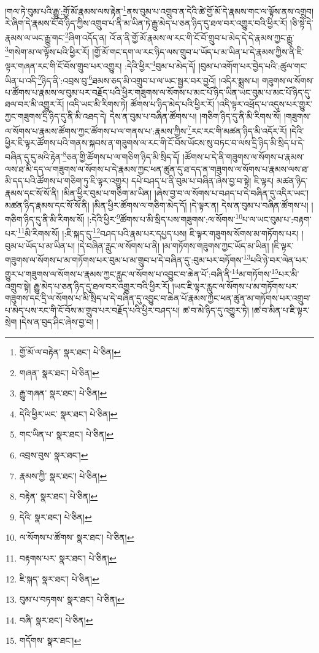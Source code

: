 །གལ་ཏེ་བུམ་པའི་རྒྱུ་:གྱོ་མོ་རྣམས་ལས་རྟེན་\footnote{གྱོ་མོ་ལ་བརྟེན་  སྣར་ཐང་།  པེ་ཅིན། }ནས་བུམ་པ་འགྲུབ་ན་དེའི་ཚེ་གྱོ་མོ་དེ་རྣམས་གང་ལ་ལྟོས་ནས་འགྲུབ། རེ་ཞིག་དེ་རྣམས་ངོ་བོ་ཉིད་ཀྱིས་འགྲུབ་པ་ནི་མ་ཡིན་ཏེ་རྒྱུ་མེད་པ་ཅན་ཉིད་དུ་ཐལ་བར་འགྱུར་བའི་ཕྱིར་རོ། །ཅི་སྟེ་དེ་རྣམས་ལ་ཡང་རྒྱུ་གང་\footnote{གཞན་  སྣར་ཐང་།  པེ་ཅིན། }ཞིག་འདོད་ན། འོ་ན་ནི་གྱོ་མོ་རྣམས་ལ་རང་གི་ངོ་བོ་གྲུབ་པ་མེད་དེ་དེ་རྣམས་ཀྱང་རྒྱུ་\footnote{རྒྱུ་གཞན་  སྣར་ཐང་།  པེ་ཅིན། }གསེག་མ་ལ་ལྟོས་པའི་ཕྱིར་རོ། །གྱོ་མོ་གང་དག་ལ་རང་ཉིད་ལས་གྲུབ་པ་ཡོད་པ་མ་ཡིན་པ་དེ་རྣམས་ཀྱིས་ནི་ཇི་ལྟར་གཞན་རང་གི་ངོ་བོས་གྲུབ་པར་འགྱུར། :དེའི་ཕྱིར་\footnote{དེའི་ཕྱིར་ཡང་  སྣར་ཐང་།  པེ་ཅིན། }བུམ་པ་མེད་དོ། །བུམ་པ་འགོག་པར་བྱེད་པའི་:ཚུལ་གང་ཡིན་པ་འདི་\footnote{གང་ཡིན་པ་  སྣར་ཐང་།  པེ་ཅིན། }ཉིད་ནི་:འབྲས་བུ་\footnote{འབྲས་བུས་  སྣར་ཐང་། }ཐམས་ཅད་མི་འགྲུབ་པ་ལ་ཡང་སྦྱར་བར་བྱའོ། །འདིར་སྨྲས་པ། གཟུགས་ལ་སོགས་པ་ཚོགས་པ་རྣམས་ལ་བུམ་པར་བརྗོད་པའི་ཕྱིར་གཟུགས་ལ་སོགས་པ་མང་པོ་ཉིད་ཡིན་ཡང་བུམ་པ་མང་པོ་ཉིད་དུ་ཐལ་བར་མི་འགྱུར་རོ། །འདི་ཡང་མི་རིགས་ཏེ། ཚོགས་པ་ཉིད་མེད་པའི་ཕྱིར་རོ། །འདི་ལྟར་འཕྲོད་པ་འདུས་པར་གྱུར་ཀྱང་གཟུགས་དྲི་ཉིད་དུ་ནི་མི་འཐད་དེ། དེས་ན་བུམ་པ་བཞིན་ཚོགས་པ། །གཅིག་ཉིད་དུ་ནི་མི་རིགས་སོ། །གཟུགས་ལ་སོགས་པ་རྣམས་ཚོགས་ཀྱང་ཚོགས་པ་ལ་གནས་པ་:རྣམས་ཀྱིས་\footnote{རྣམས་ཀྱི་  སྣར་ཐང་།  པེ་ཅིན། }རང་རང་གི་མཚན་ཉིད་མི་འདོར་རོ། །དེའི་ཕྱིར་ཇི་ལྟར་ཚོགས་པའི་གནས་སྐབས་ན་གཟུགས་ལ་རང་གི་ངོ་བོས་ཡོངས་སུ་བཏང་བ་ལས་དྲི་ཉིད་མི་སྲིད་པ་དེ་བཞིན་དུ་དུ་མའི་རྟེན་\footnote{བརྟེན་  སྣར་ཐང་།  པེ་ཅིན། }ཅན་གྱི་ཚོགས་པ་ལ་གཅིག་ཉིད་མི་སྲིད་དོ། །ཚོགས་པ་དེ་ནི་གཟུགས་ལ་སོགས་པ་རྣམས་ལས་ཐ་མི་དད་ལ་གཟུགས་ལ་སོགས་པ་དེ་རྣམས་ཀྱང་ཕན་ཚུན་དུ་ཐ་དད་ན་གཟུགས་ལ་སོགས་པ་རྣམས་ལས་ཐ་མི་དད་པའི་ཚོགས་པ་གཅིག་ཏུ་ཇི་ལྟར་འགྱུར། དཔེ་བཤད་པ་ནི་བུམ་པ་བཞིན་ཞེས་བྱ་བ་སྟེ། ཇི་ལྟར། མཚན་ཉིད་རྣམས་དང་སོ་སོ་ནི། །མིན་ཕྱིར་བུམ་པ་གཅིག་མ་ཡིན། །ཞེས་བྱ་བ་ལ་སོགས་པ་བཤད་པ་དེ་བཞིན་དུ་འདིར་ཡང་། མཚན་ཉིད་རྣམས་དང་སོ་སོ་ནི། །མིན་ཕྱིར་ཚོགས་ལ་གཅིག་མེད་དོ། །དེ་ལྟར་ན། དེས་ན་བུམ་པ་བཞིན་ཚོགས་པ། །གཅིག་ཉིད་དུ་ནི་མི་རིགས་སོ། །:དེའི་ཕྱིར་\footnote{དེའི་  སྣར་ཐང་།  པེ་ཅིན། }ཚོགས་པ་མི་སྲིད་པས་གཟུགས་:ལ་སོགས་\footnote{ལ་སོགས་པ་ཚོགས་  སྣར་ཐང་།  པེ་ཅིན། }པ་ལ་ཡང་བུམ་པ་:བརྟག་པར་\footnote{བརྟགས་པར་  སྣར་ཐང་།  པེ་ཅིན། }མི་རིགས་སོ། །:ཇི་སྐད་དུ་\footnote{ཇི་སྐད་  སྣར་ཐང་།  པེ་ཅིན། }བཤད་པའི་རྣམ་པར་དཔྱད་པས། ཇི་ལྟར་གཟུགས་སོགས་མ་གཏོགས་པར། །བུམ་པ་ཡོད་པ་མ་ཡིན་པ། །དེ་བཞིན་རླུང་ལ་སོགས་པ་ནི། །མ་གཏོགས་གཟུགས་ཀྱང་ཡོད་མ་ཡིན། །ཇི་ལྟར་གཟུགས་ལ་སོགས་པ་མ་གཏོགས་པར་བུམ་པ་མ་གྲུབ་པ་དེ་བཞིན་དུ་:བུམ་པར་བཏོགས་\footnote{བུམ་པ་བཏགས་  སྣར་ཐང་།  པེ་ཅིན། }པའི་ཉེ་བར་ལེན་པར་གྱུར་པ་གཟུགས་ལ་སོགས་པ་རྣམས་ཀྱང་རླུང་ལ་སོགས་པ་འབྱུང་བ་ཆེན་པོ་:བཞི་ནི་\footnote{བཞི་  སྣར་ཐང་།  པེ་ཅིན། }མ་གཏོགས་\footnote{གདོགས་  སྣར་ཐང་། }པར་མི་འགྲུབ་སྟེ། རྒྱུ་མེད་པ་ཅན་ཉིད་དུ་ཐལ་བར་འགྱུར་བའི་ཕྱིར་རོ། །ཡང་ཇི་ལྟར་རླུང་ལ་སོགས་པ་མ་གཏོགས་པར་གཟུགས་དང་དྲི་ལ་སོགས་པ་མི་སྲིད་པ་དེ་བཞིན་དུ་འབྱུང་བ་ཆེན་པོ་རྣམས་ཀྱང་ཕན་ཚུན་མ་གཏོགས་པར་འགྲུབ་པ་མེད་པས་རང་གི་ངོ་བོས་མ་གྲུབ་པར་བརྗོད་པའི་ཕྱིར་བཤད་པ། ཚ་བ་མེ་ཉིད་དུ་འགྱུར་ཏེ། །ཚ་བ་མིན་པ་ཇི་ལྟར་སྲེག །དེས་ན་བུད་ཤིང་ཞེས་བྱ་བ། །
